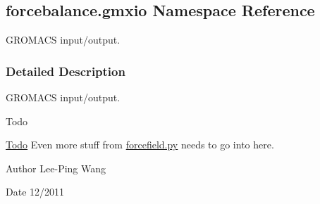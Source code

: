 \hypertarget{namespaceforcebalance_1_1gmxio}{}\subsection{forcebalance.\+gmxio Namespace Reference}
\label{namespaceforcebalance_1_1gmxio}


G\+R\+O\+M\+A\+CS input/output.  




\subsubsection{Detailed Description}
G\+R\+O\+M\+A\+CS input/output. 

\begin{DoxyRefDesc}{Todo}
\item[\hyperlink{todo__todo000008}{Todo}]Even more stuff from \hyperlink{forcefield_8py}{forcefield.\+py} needs to go into here.\end{DoxyRefDesc}


\begin{DoxyAuthor}{Author}
Lee-\/\+Ping Wang 
\end{DoxyAuthor}
\begin{DoxyDate}{Date}
12/2011 
\end{DoxyDate}
